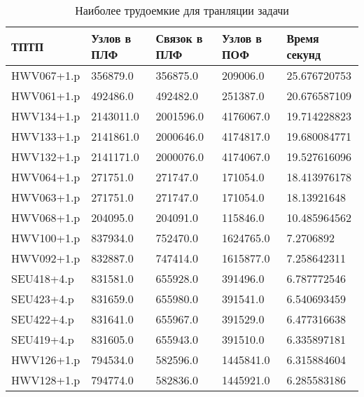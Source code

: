 \documentclass[a4paper]{jctart15b}
\begin{document}
\begin{table}[htbp]
	\caption{Наиболее трудоемкие для транляции задачи}\vspace*{2mm}
	\begin{tabular}{|l|l|l|l|l|}
		\hline
		\textbf{ТПТП} & \textbf{Узлов в ПЛФ} & \textbf{Связок в ПЛФ} & \textbf{Узлов в ПОФ} & \textbf{Время секунд} \\
		\hline
		HWV067+1.p & 356879.0 & 356875.0 & 209006.0 & 25.676720753 \\
		\hline
		HWV061+1.p & 492486.0 & 492482.0 & 251387.0 & 20.676587109 \\
		\hline
		HWV134+1.p & 2143011.0 & 2001596.0 & 4176067.0 & 19.714228823 \\
		\hline
		HWV133+1.p & 2141861.0 & 2000646.0 & 4174817.0 & 19.680084771 \\
		\hline
		HWV132+1.p & 2141171.0 & 2000076.0 & 4174067.0 & 19.527616096 \\
		\hline
		HWV064+1.p & 271751.0 & 271747.0 & 171054.0 & 18.413976178 \\
		\hline
		HWV063+1.p & 271751.0 & 271747.0 & 171054.0 & 18.13921648 \\
		\hline
		HWV068+1.p & 204095.0 & 204091.0 & 115846.0 & 10.485964562 \\
		\hline
		HWV100+1.p & 837934.0 & 752470.0 & 1624765.0 & 7.2706892 \\
		\hline
		HWV092+1.p & 832887.0 & 747414.0 & 1615877.0 & 7.258642311 \\
		\hline
		SEU418+4.p & 831581.0 & 655928.0 & 391496.0 & 6.787772546 \\
		\hline
		SEU423+4.p & 831659.0 & 655980.0 & 391541.0 & 6.540693459 \\
		\hline
		SEU422+4.p & 831641.0 & 655967.0 & 391529.0 & 6.477316638 \\
		\hline
		SEU419+4.p & 831605.0 & 655943.0 & 391510.0 & 6.335897181 \\
		\hline
		HWV126+1.p & 794534.0 & 582596.0 & 1445841.0 & 6.315884604 \\
		\hline
		HWV128+1.p & 794774.0 & 582836.0 & 1445921.0 & 6.285583186 \\
		\hline

	\end{tabular}
\end{table}

\end{document}
